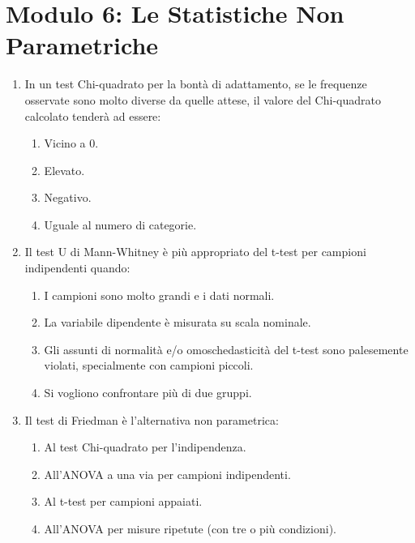 \documentclass[12pt, a4paper]{article}
\begin{document}
\section*{Modulo 6: Le Statistiche Non Parametriche}
\begin{enumerate}[resume]
    \item In un test Chi-quadrato per la bontà di adattamento, se le frequenze osservate sono molto diverse da quelle attese, il valore del Chi-quadrato calcolato tenderà ad essere:
    \begin{enumerate}
        \item Vicino a 0.
        \item Elevato.
        \item Negativo.
        \item Uguale al numero di categorie.
    \end{enumerate}
    \vspace{0.3cm}

    \item Il test U di Mann-Whitney è più appropriato del t-test per campioni indipendenti quando:
    \begin{enumerate}
        \item I campioni sono molto grandi e i dati normali.
        \item La variabile dipendente è misurata su scala nominale.
        \item Gli assunti di normalità e/o omoschedasticità del t-test sono palesemente violati, specialmente con campioni piccoli.
        \item Si vogliono confrontare più di due gruppi.
    \end{enumerate}
    \vspace{0.3cm}

    \item Il test di Friedman è l'alternativa non parametrica:
    \begin{enumerate}
        \item Al test Chi-quadrato per l'indipendenza.
        \item All'ANOVA a una via per campioni indipendenti.
        \item Al t-test per campioni appaiati.
        \item All'ANOVA per misure ripetute (con tre o più condizioni).
    \end{enumerate}
    \vspace{0.3cm}


\end{enumerate}
\end{document}

